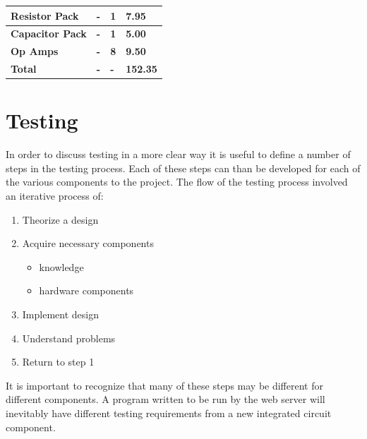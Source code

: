 \documentclass{article}	%
\begin{document}
\begin{multicols}{2}
\begin{center}
\begin{tabularx}{0.4\textwidth}{|X|X|X|X|}
        \textbf{Resistor Pack} &
        \textbf{-} &
        \textbf{1} &
        \textbf{7.95} \\
        \hline

        \textbf{Capacitor Pack} &
        \textbf{-} &
        \textbf{1} &
        \textbf{5.00} \\
        \hline

        \textbf{Op Amps} &
        \textbf{-} &
        \textbf{8} &
        \textbf{9.50} \\
        \hline

        \textbf{Total} &
        \textbf{-} &
        \textbf{-} &
        \textbf{152.35} \\

        \hline
    \end{tabularx}
\end{center}

\section{Testing}
In order to discuss testing in a more clear way
it is useful to define a number of steps
in the testing process.
Each of these steps can than be developed for
each of the various components to the project.
%
The flow of the testing process
involved an iterative process of:
\begin{enumerate}
\item Theorize a design
\item Acquire necessary components
    \begin{itemize}
    \item knowledge
    \item hardware components
    \end{itemize}
\item Implement design
\item Understand problems
\item Return to step 1
\end{enumerate}
%
It is important to recognize that many
of these steps may be different for different components.
A program written to be run by the web server
will inevitably have different testing requirements from
a new integrated circuit component.


\end{multicols}
\end{document}
